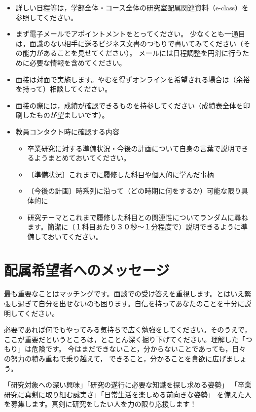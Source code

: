\documentclass[uplatex,jis2004,a4paper,11pt]{jsarticle}
\begin{document}
\begin{itemize}
  \item 詳しい日程等は，学部全体・コース全体の研究室配属関連資料（e-class）を参照してください。
  \item まず電子メールでアポイントメントをとってください。
    少なくとも一通目は，面識のない相手に送るビジネス文書のつもりで書いてみてください（その能力があることを見せてください）。
    メールには日程調整を円滑に行うために必要な情報を含めてください。
  \item 面接は対面で実施します。やむを得ずオンラインを希望される場合は（余裕を持って）相談してください。
  \item 面接の際には，成績が確認できるものを持参してください（成績表全体を印刷したものが望ましいです）。
  \item 教員コンタクト時に確認する内容
    \begin{itemize}
      \item 卒業研究に対する準備状況・今後の計画について自身の言葉で説明できるようまとめておいてください。
      \item 〔準備状況〕これまでに履修した科目や個人的に学んだ事柄
      \item 〔今後の計画〕時系列に沿って（どの時期に何をするか）可能な限り具体的に
      \item 研究テーマとこれまで履修した科目との関連性についてランダムに尋ねます。簡潔に（１科目あたり３０秒～１分程度で）説明できるように準備しておいてください。
    \end{itemize}
\end{itemize}

\section{配属希望者へのメッセージ}

最も重要なことはマッチングです。面談での受け答えを重視します。とはいえ緊張し過ぎて自分を出せないのも困ります。自信を持ってあなたのことを十分に説明してください。

必要であれば何でもやってみる気持ちで広く勉強をしてください。そのうえで，ここが重要だというところは，とことん深く掘り下げてください。理解した「つもり」は危険です。
今はまだできないこと，分からないことであっても，日々の努力の積み重ねで乗り越えて，
できること，分かることを貪欲に広げましょう。

「研究対象への深い興味」「研究の遂行に必要な知識を探し求める姿勢」
「卒業研究に真剣に取り組む誠実さ」「日常生活を楽しめる前向きな姿勢」
を備えた人を募集します。真剣に研究をしたい人を力の限り応援します！

%
%
\end{document}
